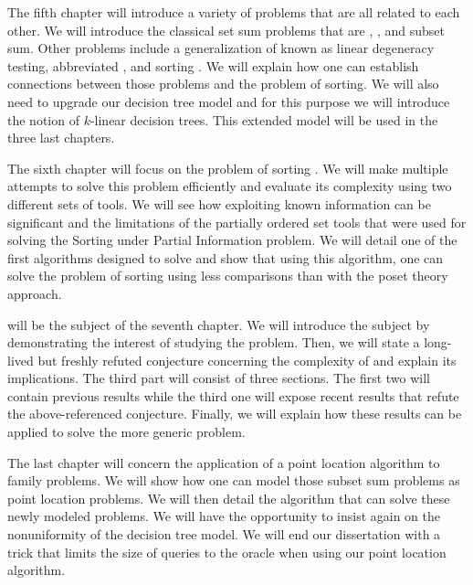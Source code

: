 The fifth chapter will introduce a variety of problems that are all related to
each other. We will introduce the classical set sum problems that are
\threeSUM, \kSUM, and subset sum. Other problems include a generalization of
\kSUM known as linear degeneracy testing, abbreviated \kLDT, and sorting \XY.
We will explain how one can establish connections between those problems and the problem
of sorting. We will also need to upgrade our decision tree model and for this
purpose we will introduce the notion of \(k\)-linear decision trees. This
extended model will be used in the three last chapters.

The sixth chapter will focus on the problem of sorting \XY. We will make
multiple attempts to solve this problem efficiently and evaluate its complexity
using two different sets of tools. We will see how exploiting known information
can be significant and the limitations of the partially ordered set tools that
were used for solving the Sorting under Partial Information problem. We will
detail one of the first algorithms designed to solve  and
show that using this algorithm, one can solve the problem of sorting \XY
using less comparisons than with the poset theory approach.

\threeSUM will be the subject of the seventh chapter. We will introduce the
subject by demonstrating the interest of studying the \threeSUM problem. Then,
we will state a long-lived but freshly refuted conjecture concerning the
complexity of \threeSUM and explain its implications. The third part will
consist of three sections. The first two will contain previous results while
the third one will expose recent results that refute the above-referenced
conjecture. Finally, we will explain how these results can be applied to solve
the more generic \kLDT problem.

The last chapter will concern the application of a point location algorithm to
\kSUM family problems. We will show how one can model those subset sum
problems as point location problems. We will then detail the algorithm that
can solve these newly modeled problems. We will have the opportunity to insist again
on the nonuniformity of the decision tree model. We will end our dissertation
with a trick that limits the size of queries to the oracle when
using our point location algorithm.
